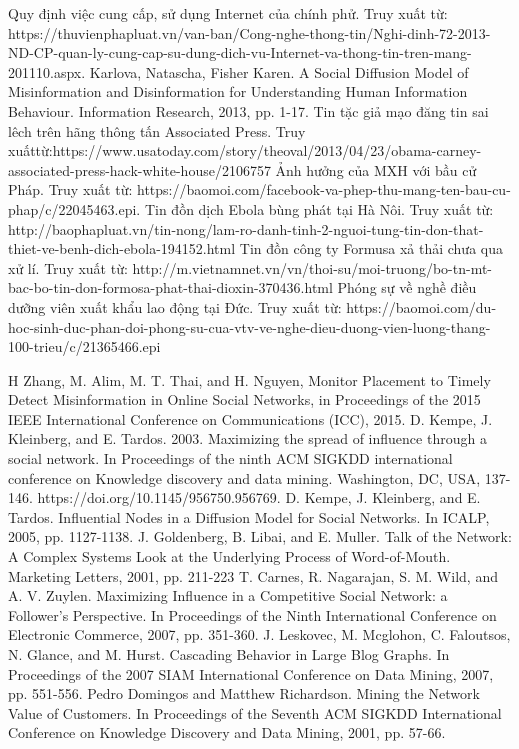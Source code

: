 
\begin{thebibliography}{4}
	 Quy định việc cung cấp, sử dụng Internet của chính phử. Truy xuất từ: https://thuvienphapluat.vn/van-ban/Cong-nghe-thong-tin/Nghi-dinh-72-2013-ND-CP-quan-ly-cung-cap-su-dung-dich-vu-Internet-va-thong-tin-tren-mang-201110.aspx. 
	 Karlova, Natascha, Fisher Karen. A Social Diffusion Model of Misinformation and Disinformation for Understanding Human Information Behaviour. Information Research, 2013, pp. 1-17.
	Tin tặc giả mạo đăng tin sai lêch trên hãng thông tấn Associated Press. Truy xuấttừ:https://www.usatoday.com/story/theoval/2013/04/23/obama-carney-associated-press-hack-white-house/2106757
	 Ảnh hưởng của MXH với bầu cử Pháp. Truy xuất từ:  https://baomoi.com/facebook-va-phep-thu-mang-ten-bau-cu-phap/c/22045463.epi.
	 Tin đồn dịch Ebola bùng phát tại Hà Nôi. Truy xuất từ: http://baophapluat.vn/tin-nong/lam-ro-danh-tinh-2-nguoi-tung-tin-don-that-thiet-ve-benh-dich-ebola-194152.html
	 Tin đồn công ty Formusa xả thải chưa qua xử lí. Truy xuất từ: http://m.vietnamnet.vn/vn/thoi-su/moi-truong/bo-tn-mt-bac-bo-tin-don-formosa-phat-thai-dioxin-370436.html
	 Phóng sự về nghề điều dưỡng viên xuất khẩu lao động tại Đức. Truy xuất từ: https://baomoi.com/du-hoc-sinh-duc-phan-doi-phong-su-cua-vtv-ve-nghe-dieu-duong-vien-luong-thang-100-trieu/c/21365466.epi
	
	 H Zhang, M. Alim, M. T. Thai, and H. Nguyen, Monitor Placement to Timely Detect Misinformation in Online Social Networks, in Proceedings of the 2015 IEEE International Conference on Communications (ICC), 2015.
	 D. Kempe, J. Kleinberg, and E. Tardos. 2003. Maximizing the spread of influence through a social network. In Proceedings of the ninth ACM SIGKDD international conference on Knowledge discovery and data mining. Washington, DC, USA, 137-146. https://doi.org/10.1145/956750.956769. 
	 D. Kempe, J. Kleinberg, and E. Tardos. Influential Nodes in a Diffusion Model for Social Networks. In ICALP, 2005, pp. 1127-1138.
	 J. Goldenberg, B. Libai, and E. Muller. Talk of the Network: A Complex Systems Look at the Underlying Process of Word-of-Mouth. Marketing Letters, 2001, pp. 211-223
	 T. Carnes, R. Nagarajan, S. M. Wild, and A. V. Zuylen. Maximizing Influence in a Competitive Social Network: a Follower’s Perspective. In Proceedings of the Ninth International Conference on Electronic Commerce, 2007, pp. 351-360.
	 J. Leskovec, M. Mcglohon, C. Faloutsos, N. Glance, and M. Hurst. Cascading Behavior in Large Blog Graphs. In Proceedings of the 2007 SIAM International Conference on Data Mining, 2007, pp. 551-556.
	 Pedro Domingos and Matthew Richardson. Mining the Network Value of Customers. In Proceedings of the Seventh ACM SIGKDD International Conference on Knowledge Discovery and Data Mining, 2001, pp. 57-66.
	

\end{thebibliography}
